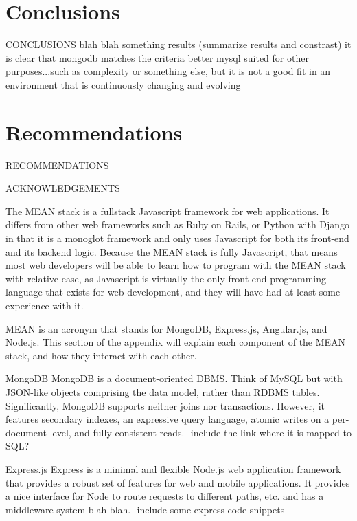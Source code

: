 \documentclass[12pt]{article}
\begin{document}
\section{Conclusions}
CONCLUSIONS
blah blah something results (summarize results and constrast)
it is clear that mongodb matches the criteria better
mysql suited for other purposes...such as complexity or something else, but it is not a good fit in an environment that is continuously changing and evolving
\cite{smpl}

\section{Recommendations}
RECOMMENDATIONS

\newpage



\newpage


ACKNOWLEDGEMENTS
\newpage



The MEAN stack is a fullstack Javascript framework for web applications. It differs from other web frameworks such as Ruby on Rails, or Python with Django in that it is a monoglot framework and only uses Javascript for both its front-end and its backend logic. Because the MEAN stack is fully Javascript, that means most web developers will be able to learn how to program with the MEAN stack with relative ease, as Javascript is virtually the only front-end programming language that exists for web development, and they will have had at least some experience with it.

MEAN is an acronym that stands for MongoDB, Express.js, Angular.js, and Node.js. This section of the appendix will explain each component of the MEAN stack, and how they interact with each other.

MongoDB %
MongoDB is a document-oriented DBMS. Think of MySQL but with JSON-like objects comprising the data model, rather than RDBMS tables. Significantly, MongoDB supports neither joins nor transactions. However, it features secondary indexes, an expressive query language, atomic writes on a per-document level, and fully-consistent reads.
-include the link where it is mapped to SQL?

Express.js %
Express is a minimal and flexible Node.js web application framework that provides a robust set of features for web and mobile applications.
It provides a nice interface for Node to route requests to different paths, etc. and has a middleware system blah blah.
-include some express code snippets
\end{document}
